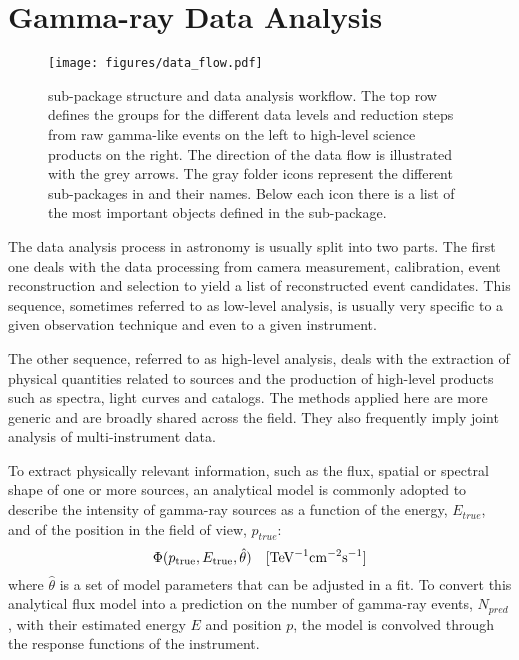 \documentclass[traditabstract, longauth]{aa}
\begin{document}
\section{Gamma-ray Data Analysis}
%
\begin{figure*}[h!]
	\centering
	\texttt{[image: figures/data\_flow.pdf]}
	\caption{
		\gammapy sub-package structure and data analysis workflow. The top row
        defines the groups for the different data levels and reduction steps
        from raw gamma-like events on the left to high-level science products
        on the right. The direction of the data flow is illustrated with the
        grey arrows. The gray folder icons represent the different sub-packages
        in \gammapy and their names. Below each icon there is a list of the most
        important objects defined in the sub-package.
    }
	\label{fig:data_flow}
\end{figure*}
%
\label{sec:gammaray-data-analysis}
The data analysis process in \gammaray astronomy is usually split into two parts.
The first one deals with the data processing from camera measurement, calibration, event
reconstruction and selection to yield a list of reconstructed \gammaray event candidates.
This sequence, sometimes referred to as low-level analysis, is usually very specific to
a given observation technique and even to a given instrument.

The other sequence, referred to as high-level analysis, deals with the extraction of physical
quantities related to \gammaray sources and the production of high-level products such as spectra,
light curves and catalogs. The methods applied here are more generic and are broadly
shared across the field. They also frequently imply joint analysis of multi-instrument data.


To extract physically relevant information, such as the flux, spatial or spectral shape of one or more sources,
an analytical model is commonly adopted to describe the intensity of gamma-ray sources as a function of the energy,
$E_{true}$, and of the position in the field of view, $p_{true}$:
$$ \Phi(p_{\rm true}, E_{\rm true}, \hat{\theta}) \quad \mathrm{[TeV^{-1}cm^{-2}s^{-1}]} $$
where $\hat{\theta}$ is a set of model parameters that can be adjusted in a fit. To convert this analytical flux model
into a prediction on the number of gamma-ray events, $N_{pred}$, with their estimated energy $E$  and position $p$, the model
is convolved through the response functions of the instrument.
\end{document}
